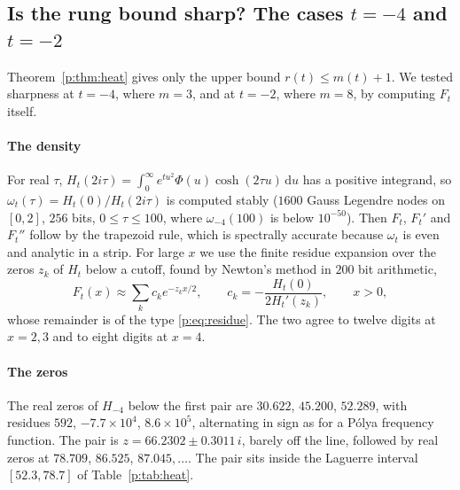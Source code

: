 \subsection{Is the rung bound sharp? The cases \texorpdfstring{$t=-4$}{t = -4} and \texorpdfstring{$t=-2$}{t = -2}}\label{p:sec:sharp}

Theorem~\ref{p:thm:heat} gives only the upper bound $r(t)\le m(t)+1$. We tested sharpness at $t=-4$, where $m=3$, and at $t=-2$, where $m=8$, by computing $F_t$ itself.

\paragraph{The density} For real $\tau$, $H_t(2i\tau)=\int_0^\infty e^{tu^2}\Phi(u)\cosh(2\tau u)\,\mathrm du$ has a positive integrand, so $\omega_t(\tau)=H_t(0)/H_t(2i\tau)$ is computed stably ($1600$ Gauss Legendre nodes on $[0,2]$, $256$ bits, $0\le\tau\le100$, where $\omega_{-4}(100)$ is below $10^{-50}$). Then $F_t$, $F_t'$ and $F_t''$ follow by the trapezoid rule, which is spectrally accurate because $\omega_t$ is even and analytic in a strip. For large $x$ we use the finite residue expansion over the zeros $z_k$ of $H_t$ below a cutoff, found by Newton's method in $200$ bit arithmetic,
\[
F_t(x)\approx\sum_k c_k e^{-z_kx/2},\qquad c_k=-\frac{H_t(0)}{2H_t'(z_k)},\qquad x>0,
\]
whose remainder is of the type \eqref{p:eq:residue}. The two agree to twelve digits at $x=2,3$ and to eight digits at $x=4$.

\paragraph{The zeros} The real zeros of $H_{-4}$ below the first pair are $30.622$, $45.200$, $52.289$, with residues $592$, $-7.7\times10^4$, $8.6\times10^5$, alternating in sign as for a P\'olya frequency function. The pair is $z=66.2302\pm0.3011\,i$, barely off the line, followed by real zeros at $78.709$, $86.525$, $87.045,\dots$. The pair sits inside the Laguerre interval $[52.3,78.7]$ of Table~\ref{p:tab:heat}.

